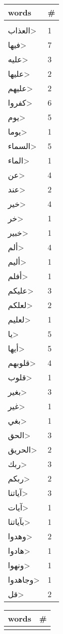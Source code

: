\documentclass{article}
\begin{document}
\begin{multicols}{6}
\begin{center}
\begin{tabular}{ P{2cm}  P{1cm}}
\textbf{words}    & \textbf{\#}  \\
\hline
\\[0.01cm]
\<العذاب> & 1 \\ 
\<فيها> & 7 \\ 
\<عليه> & 3 \\ 
\<عليها> & 2 \\ 
\<عليهم> & 2 \\ 
\<كفروا> & 6 \\ 
\<يوم> & 5 \\ 
\<يوما> & 1 \\ 
\<السماء> & 5 \\ 
\<الماء> & 1 \\ 
\<عن> & 4 \\ 
\<عند> & 2 \\ 
\<خير> & 4 \\ 
\<خر> & 1 \\ 
\<خبير> & 1 \\ 
\<ألم> & 4 \\ 
\<أليم> & 1 \\ 
\<أفلم> & 1 \\ 
\<عليكم> & 3 \\ 
\<لعلكم> & 2 \\ 
\<لعليم> & 1 \\ 
\<يا> & 5 \\ 
\<أيها> & 5 \\ 
\<قلوبهم> & 4 \\ 
\<قلوب> & 1 \\ 
\<بغير> & 3 \\ 
\<غير> & 1 \\ 
\<بغي> & 1 \\ 
\<الحق> & 3 \\ 
\<الحريق> & 2 \\ 
\<ربك> & 3 \\ 
\<ربكم> & 2 \\ 
\<آياتنا> & 3 \\ 
\<آيات> & 1 \\ 
\<بآياتنا> & 1 \\ 
\<وهدوا> & 2 \\ 
\<هادوا> & 1 \\ 
\<ونهوا> & 1 \\ 
\<وجاهدوا> & 1 \\ 
\<قل> & 2 \\ 
\end{tabular} 
\begin{tabular}{ P{2cm}  P{1cm}} 
\textbf{words}    & \textbf{\#}  \\
\hline
\\[0.01cm]

\end{tabular}
\end{center}
\end{multicols}
\end{document}
